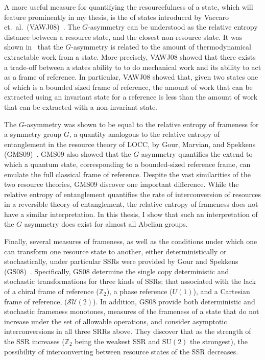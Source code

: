 A more useful measure for quantifying the resourcefulness of a state, which will feature prominently in my thesis, is the of states introduced by Vaccaro et.~al.~(VAWJ08)~\cite{VAWJ08}.  The $G$-asymmetry can be understood as the relative entropy distance between a resource state,  and the closest non-resource state.  It was shown in~\cite{VAWJ08} that the $G$-asymmetry is related to the amount of thermodynamical extractable work from a state.  More precisely, VAWJ08 showed that there exists a trade-off between a states ability to to do mechanical work and its ability to act as a frame of reference. In particular, VAWJ08 showed that, given two states one of which is a bounded sized frame of reference, the amount of work that can be extracted using an invariant state for a reference is less than the amount of work that can be extracted with a non-invariant state.  

The $G$-asymmetry was shown to be equal to the relative entropy of frameness for a symmetry group $G$, a quantity analogous to the relative entropy of entanglement in the resource theory of LOCC, by Gour, Marvian, and Spekkens (GMS09)~\cite{GMS09}.  GMS09 also showed that the $G$-asymmetry quantifies the extend to which a quantum state, corresponding to a bounded-sized reference frame, can emulate the full classical frame of reference. Despite the vast similarities of the two resource theories, GMS09 discover one important difference. While the relative entropy of entanglement quantifies the rate of interconversion of resources in a reversible theory of entanglement,  the relative entropy of frameness does not have a similar interpretation.  In this thesis, I show that such an interpretation of the $G$ asymmetry does exist for almost all Abelian groups.

Finally, several measures of frameness, as well as the conditions under which one can transform one resource state to another, either deterministically or stochastically, under particular SSRs were provided by Gour and Spekkens (GS08)~\cite{GS08}.  Specifically, GS08 determine the single copy deterministic and stochastic transformations for three kinds of SSRs; that associated with the lack of a chiral frame of reference ($\mathbb{Z}_2$), a phase reference ($U(1)$), and a Cartesian frame of reference, ($\mathcal{SU}(2)$).  In addition, GS08 provide both deterministic and stochastic frameness monotones, measures of the frameness of a state that do not increase under the set of allowable operations, and consider asymptotic interconversions in all three SRRs above.  They discover that as the strength of the SSR increases ($\mathbb{Z}_2$ being the weakest SSR and $\mathrm{SU}(2)$ the strongest), the possibility of interconverting between resource states of the SSR decreases.  

